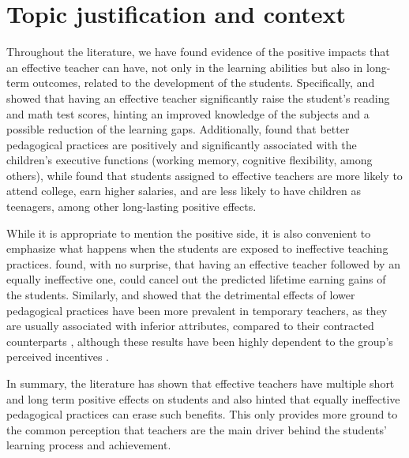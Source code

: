 \section{Topic justification and context}

Throughout the literature, we have found evidence of the positive impacts that an effective teacher can have, not only in the learning abilities but also in long-term outcomes, related to the development of the students. Specifically, \citet{Rockoff_2004, Rivkin_et_al_2005, Duflo_et_al_2009, Hanushek_et_al_2012, Muralidharan_et_al_2013, Chetty_et_al_2014a} and \citet{Araujo_et_al_2016} showed that having an effective teacher significantly raise the student's reading and math test scores, hinting an improved knowledge of the subjects and a possible reduction of the learning gaps. Additionally, \citet{Araujo_et_al_2016} found that better pedagogical practices are positively and significantly associated with the children's executive functions (working memory, cognitive flexibility, among others), while \citet{Chetty_et_al_2014b} found that students assigned to effective teachers are more likely to attend college, earn higher salaries, and are less likely to have children as teenagers, among other long-lasting positive effects.

While it is appropriate to mention the positive side, it is also convenient to emphasize what happens when the students are exposed to ineffective teaching practices. \citet{Hanushek_et_al_2012} found, with no surprise, that having an effective teacher followed by an equally ineffective one, could cancel out the predicted lifetime earning gains of the students. Similarly, \citet{Ayala_2017} and \citet{Marotta_2019} showed that the detrimental effects of lower pedagogical practices have been more prevalent in temporary teachers, as they are usually associated with inferior attributes, compared to their contracted counterparts \citep{Bertoni_et_al_2020a}, although these results have been highly dependent to the group's perceived incentives \citep{Duflo_et_al_2009, Muralidharan_et_al_2013, Duflo_et_al_2015}.

In summary, the literature has shown that effective teachers have multiple short and long term positive effects on students and also hinted that equally ineffective pedagogical practices can erase such benefits. This only provides more ground to the common perception that teachers are the main driver behind the students' learning process and achievement. \\

